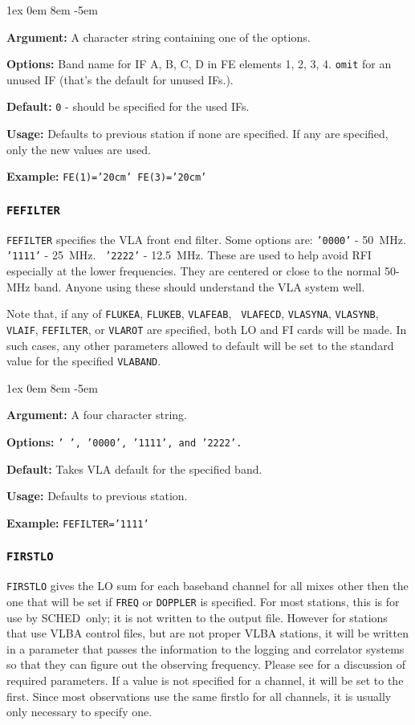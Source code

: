 \documentclass{report}
\newcommand{\schedb}{{\sc SCHED~}}
\newcommand{\rcwbox}[5]{
  \begin{list}{}{\parsep 1ex  \itemsep 0em
                 \leftmargin 8em  \itemindent -5em }
    \item {\bf Argument:} #1
    \item {\bf Options:}  #2
    \item {\bf Default:}  #3
    \item {\bf Usage:}    #4
    \item {\bf Example:}  #5
  \end{list}
}
\begin{document}
\rcwbox
{A character string containing one of the options.}
{Band name for IF A, B, C, D in FE elements 1, 2, 3, 4.  {\tt omit}
for an unused IF (that's the default for unused IFs.).}
{{\tt 0} - should be specified for the used IFs.}
{Defaults to previous station if none are specified.  If any are
specified, only the new values are used.}
{{\tt FE(1)='20cm' FE(3)='20cm'}}


\subsubsection{\label{SP:FEFILTER}{\tt FEFILTER}}

{\tt FEFILTER} specifies the VLA front end filter.  Some
options are: {\tt '0000'} - 50~MHz.  {\tt '1111'} - 25~MHz.  {\tt
'2222'} - 12.5~MHz.  These are used to help avoid RFI especially at
the lower frequencies. They are centered or close to the normal 50-MHz
band. Anyone using these should understand the VLA system well.

Note that, if any of {\tt FLUKEA}, {\tt FLUKEB}, {\tt VLAFEAB}, {\tt
VLAFECD}, {\tt VLASYNA}, {\tt VLASYNB}, {\tt VLAIF}, {\tt FEFILTER},
or {\tt VLAROT} are specified, both LO and FI cards will be made.  In
such cases, any other parameters allowed to default will be set to the
standard value for the specified {\tt VLABAND}.

\rcwbox
{A four character string.}
{{\tt '    ', '0000', '1111', and '2222'.} }
{Takes VLA default for the specified band.}
{Defaults to previous station.}
{{\tt FEFILTER='1111'}}


\subsubsection{\label{SP:FIRSTLO}{\tt FIRSTLO}}

{\tt FIRSTLO} gives the LO sum for each baseband channel for all mixes
other then the one that will be set if {\tt FREQ} or {\tt DOPPLER} is
specified.  For most stations, this is for use by \schedb only; it
is not written to the output file.  However for stations that use VLBA
control files, but are not proper VLBA stations, it will be written in
a parameter that passes the information to the logging and correlator
systems so that they can figure out the observing frequency.  Please
see  for a discussion of required
parameters.  If a value is not specified for a channel, it will be
set to the first.  Since most observations use the same firstlo
for all channels, it is usually only necessary to specify one.
\end{document}
